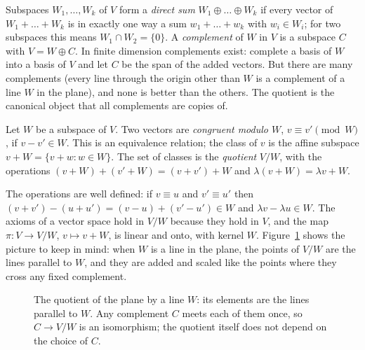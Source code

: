 Subspaces $W_1,\dots,W_k$ of $V$ form a \emph{direct sum} $W_1\oplus\dots\oplus W_k$ if every vector of $W_1+\dots+W_k$ is
in exactly one way a sum $w_1+\dots+w_k$ with $w_i\in W_i$; for two subspaces this means $W_1\cap W_2=\{0\}$. A
\emph{complement} of $W$ in $V$ is a subspace $C$ with $V=W\oplus C$. In finite dimension complements exist: complete a
basis of $W$ into a basis of $V$ and let $C$ be the span of the added vectors. But there are many complements (every
line through the origin other than $W$ is a complement of a line $W$ in the plane), and none is better than the others.
The quotient is the canonical object that all complements are copies of.

\begin{definition}\label{linear:def:quotient}
Let $W$ be a subspace of $V$. Two vectors are \emph{congruent modulo $W$}, $v\equiv v'\pmod W$, if $v-v'\in W$. This is
an equivalence relation; the class of $v$ is the affine subspace $v+W=\{v+w:w\in W\}$. The set of classes is the
\emph{quotient} $V/W$, with the operations $(v+W)+(v'+W)=(v+v')+W$ and $\lambda(v+W)=\lambda v+W$.
\end{definition}

The operations are well defined: if $v\equiv u$ and $v'\equiv u'$ then $(v+v')-(u+u')=(v-u)+(v'-u')\in W$ and
$\lambda v-\lambda u\in W$. The axioms of a vector space hold in $V/W$ because they hold in $V$, and the map
$\pi:V\to V/W$, $v\mapsto v+W$, is linear and onto, with kernel $W$. Figure~\ref{linear:fig:quotient} shows the picture to keep
in mind: when $W$ is a line in the plane, the points of $V/W$ are the lines parallel to $W$, and they are added and
scaled like the points where they cross any fixed complement.

\begin{figure}[ht]
\centering
{}
\caption{The quotient of the plane by a line $W$: its elements are the lines parallel to $W$. Any complement $C$ meets
each of them once, so $C\to V/W$ is an isomorphism; the quotient itself does not depend on the choice of $C$.}
\label{linear:fig:quotient}
\end{figure}


